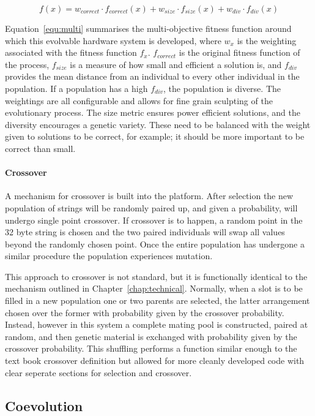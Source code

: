\begin{equation}
	\label{equ:multi}
	f(x) = w_{correct} \cdot f_{correct}(x) + w_{size} \cdot f_{size}(x) +
	w_{div} \cdot f_{div}(x)
\end{equation}

Equation~\ref{equ:multi} summarises the multi-objective fitness function around
which this evolvable hardware system is developed, where $w_x$ is the weighting
associated with the fitness function $f_x$. $f_{correct}$ is the original fitness
function of the process, $f_{size}$ is a measure of how small and efficient a
solution is, and $f_{div}$ provides the mean distance from an individual to
every other individual in the population. If a population has a high $f_{div}$,
the population is diverse.
The weightings are all
configurable and allows for fine grain sculpting of the evolutionary process.
The size metric ensures power efficient solutions, and the diversity encourages
a genetic variety. These need to be balanced with the weight given to solutions
to be correct, for example; it should be more important to be correct than small.

\paragraph{Crossover}
A mechanism for crossover is built into the platform.
After selection the new population of strings will be randomly paired up, and given
a probability, will undergo single point crossover. If crossover is to happen, a
random point in the 32 byte string is chosen and the two paired individuals will
swap all values beyond the randomly chosen point. Once the entire population has
undergone a similar procedure the population experiences mutation.

This approach to crossover is not standard, but it is functionally identical to
the mechanism outlined in Chapter~\ref{chap:technical}. Normally, when a slot is
to be filled in a new population one or two parents are selected, the latter arrangement
chosen over the former with probability given by the crossover probability. Instead, however
in this system a complete
mating pool is constructed, paired at random, and then genetic material is exchanged with
probability given by the crossover probability. This shuffling performs a function similar
enough to the text book crossover definition \cite{Goldberg:1989:GAS:534133} but
allowed for more cleanly developed
code with clear seperate sections for selection and crossover.

\subsection{Coevolution \label{ss:coev}}

